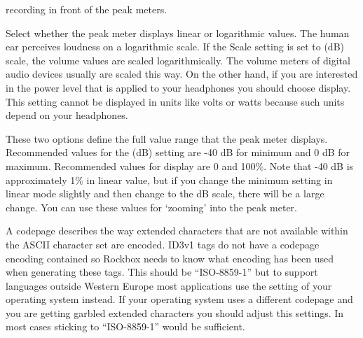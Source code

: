 \begin{description}
{\begin{description}
{          recording in front of the peak meters.
      }
      \item[\label{ref:Peakmetersetting}Scale:]
        Select whether the peak meter displays linear or logarithmic values.
        The human ear perceives loudness on a logarithmic scale. If the Scale
        setting is set to  (dB) scale, the volume values
        are scaled logarithmically. The volume meters of digital audio
        devices usually are scaled this way. On the other hand, if you
        are interested in the power level that is applied to your headphones
        you should choose  display. This setting cannot be
        displayed in units like volts or watts because such units depend
        on your headphones.
      \item[Minimum and maximum range:]
        These two options define the full value range that the peak meter
        displays. Recommended values for the  (dB) setting
        are {}-40 dB for minimum and 0 dB for maximum. Recommended values
        for  display are 0 and 100\%. Note that {}-40 dB is
        approximately 1\% in linear value, but if you change the minimum
        setting in linear mode slightly and then change to the dB scale,
        there will be a large change. You can use these values for `zooming'
        into the peak meter.
      \end{description}
    }
    \item[\label{ref:Defaultcodepage}Default Codepage:]
      A codepage describes the way extended characters that are not available
      within the ASCII character set are encoded. ID3v1 tags do not have a
      codepage encoding contained so Rockbox needs to know what encoding has
      been used when generating these tags. This should be ``ISO-8859-1'' but
      to support languages outside Western Europe most applications use
      the setting of your operating system instead. If your operating system
      uses a different codepage and you are getting garbled extended characters
      you should adjust this settings. In most cases sticking to
      ``ISO-8859-1'' would be sufficient.
  \end{description}
